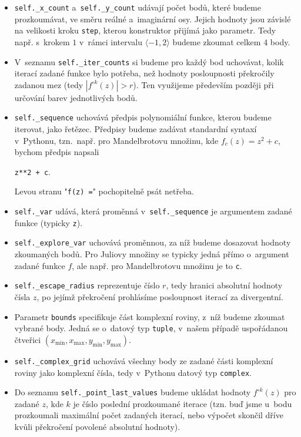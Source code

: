 \begin{itemize}
    \item \texttt{self.\_x\_count} a~\texttt{self.\_y\_count} udávají počet bodů, které budeme prozkoumávat, ve směru reálné a~imaginární osy. Jejich hodnoty jsou závislé na velikosti kroku \texttt{step}, kterou konstruktor přijímá jako parametr. Tedy např. s~krokem $1$ v~rámci intervalu $\langle-1,2\rangle$ budeme zkoumat celkem 4 body.
    \item V~seznamu \texttt{self.\_iter\_counts} si budeme pro každý bod uchovávat, kolik iterací zadané funkce bylo potřeba, než hodnoty posloupnosti překročily zadanou mez (tedy $|f^{\circ k}(z)|>r$). Ten využijeme především později při určování barev jednotlivých bodů.
    \item \texttt{self.\_sequence} uchovává předpis polynomiální funkce, kterou budeme iterovat, jako řetězec. Předpisy budeme zadávat standardní syntaxí v~Pythonu, tzn.~např. pro Mandelbrotovu množinu, kde $f_c(z)=z^2+c$, bychom předpis napsali
    \begin{center}
        \texttt{z**2 + c}.
    \end{center}
    Levou stranu "\texttt{f(z) =}" pochopitelně psát netřeba.
    \item \texttt{self.\_var} udává, která proměnná v~\texttt{self.\_sequence} je argumentem zadané funkce (typicky \texttt{z}).
    \item \texttt{self.\_explore\_var} uchovává proměnnou, za níž budeme dosazovat hodnoty zkoumaných bodů. Pro Juliovy množiny se typicky jedná přímo o~argument zadané funkce $f$, ale např. pro Mandelbrotovu množinu je to \texttt{c}.
    \item \texttt{self.\_escape\_radius} reprezentuje číslo $r$, tedy hranici absolutní hodnoty čísla $z$, po jejímž překročení prohlásíme posloupnost iterací za divergentní.
    \item Parametr \texttt{bounds} specifikuje část komplexní roviny, z~níž budeme zkoumat vybrané body. Jedná se o~datový typ \texttt{tuple}, v~našem případě uspořádanou čtveřici $(x_{\text{min}},x_{\text{max}},y_{\text{min}},y_{\text{max}})$.
    \item \texttt{self.\_complex\_grid} uchovává všechny body ze zadané části komplexní roviny jako komplexní čísla, tedy v~Pythonu datový typ \texttt{complex}.
    \item Do seznamu \texttt{self.\_point\_last\_values} budeme ukládat hodnoty $f^{\circ k}(z)$ pro zadané $z$, kde $k$ je číslo poslední prozkoumané iterace (tzn. buď jsme u~bodu prozkoumali maximální počet zadaných iterací, nebo výpočet skončil dříve kvůli překročení povolené absolutní hodnoty).
\end{itemize}
